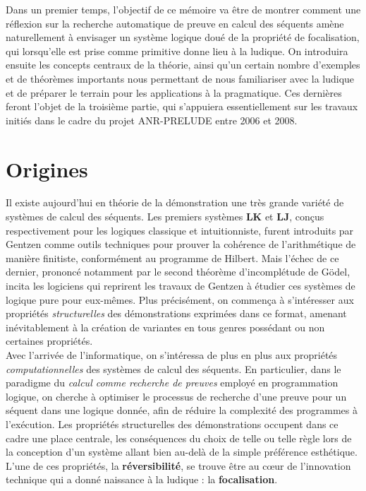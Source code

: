 \documentclass[12pt]{report}
\begin{document}
Dans un premier temps, l'objectif de ce mémoire va être de montrer comment une réflexion sur la recherche automatique de preuve en calcul des séquents amène naturellement à envisager un système logique doué de la propriété de focalisation, qui lorsqu'elle est prise comme primitive donne lieu à la ludique. On introduira ensuite les concepts centraux de la théorie, ainsi qu'un certain nombre d'exemples et de théorèmes importants nous permettant de nous familiariser avec la ludique et de préparer le terrain pour les applications à la pragmatique. Ces dernières feront l'objet de la troisième partie, qui s'appuiera essentiellement sur les travaux initiés dans le cadre du projet ANR-PRELUDE entre 2006 et 2008.

\chapter{Origines}

Il existe aujourd'hui en théorie de la démonstration une très grande variété de systèmes de calcul des séquents. Les premiers systèmes $\mathbf{LK}$ et $\mathbf{LJ}$, conçus respectivement pour les logiques classique et intuitionniste, furent introduits par Gentzen comme outils techniques pour prouver la cohérence de l'arithmétique de manière finitiste, conformément au programme de Hilbert. Mais l'échec de ce dernier, prononcé notamment par le second théorème d'incomplétude de Gödel, incita les logiciens qui reprirent les travaux de Gentzen à étudier ces systèmes de logique pure pour eux-mêmes. Plus précisément, on commença à s'intéresser aux propriétés \emph{structurelles} des démonstrations exprimées dans ce format, amenant inévitablement à la création de variantes en tous genres possédant ou non certaines propriétés.\\

Avec l'arrivée de l'informatique, on s'intéressa de plus en plus aux propriétés \emph{computationnelles} des systèmes de calcul des séquents. En particulier, dans le paradigme du \emph{calcul comme recherche de preuves} employé en programmation logique, on cherche à optimiser le processus de recherche d'une preuve pour un séquent dans une logique donnée, afin de réduire la complexité des programmes à l'exécution. Les propriétés structurelles des démonstrations occupent dans ce cadre une place centrale, les conséquences du choix de telle ou telle règle lors de la conception d'un système allant bien au-delà de la simple préférence esthétique. L'une de ces propriétés, la \textbf{réversibilité}, se trouve être au c\oe{}ur de l'innovation technique qui a donné naissance à la ludique : la \textbf{focalisation}.
\end{document}
